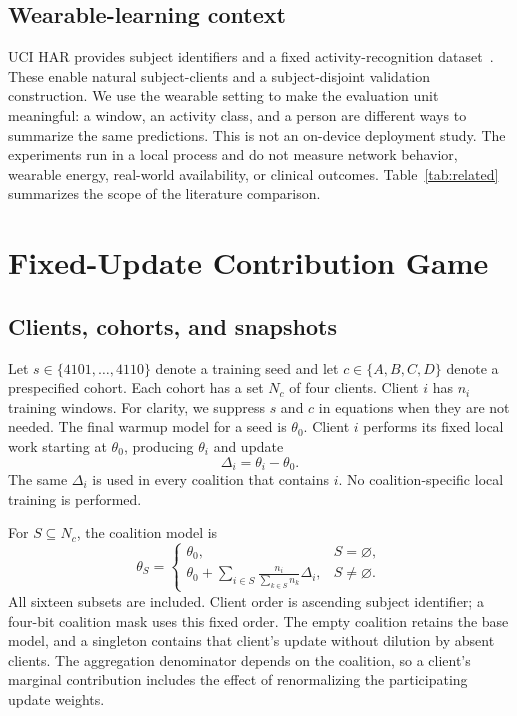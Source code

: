 \documentclass[conference,letterpaper]{IEEEtran}
\begin{document}
\subsection{Wearable-learning context}
UCI HAR provides subject identifiers and a fixed activity-recognition dataset~\cite{har,uci}. These enable natural subject-clients and a subject-disjoint validation construction. We use the wearable setting to make the evaluation unit meaningful: a window, an activity class, and a person are different ways to summarize the same predictions. This is not an on-device deployment study. The experiments run in a local process and do not measure network behavior, wearable energy, real-world availability, or clinical outcomes. Table~\ref{tab:related} summarizes the scope of the literature comparison.

\section{Fixed-Update Contribution Game}
\subsection{Clients, cohorts, and snapshots}
Let $s\in\{4101,\ldots,4110\}$ denote a training seed and let $c\in\{A,B,C,D\}$ denote a prespecified cohort. Each cohort has a set $N_c$ of four clients. Client $i$ has $n_i$ training windows. For clarity, we suppress $s$ and $c$ in equations when they are not needed. The final warmup model for a seed is $\theta_0$. Client $i$ performs its fixed local work starting at $\theta_0$, producing $\theta_i$ and update
\begin{equation}
\Delta_i=\theta_i-\theta_0.
\end{equation}
The same $\Delta_i$ is used in every coalition that contains $i$. No coalition-specific local training is performed.

For $S\subseteq N_c$, the coalition model is
\begin{equation}
\theta_S=\begin{cases}
\theta_0,&S=\varnothing,\\
\displaystyle\theta_0+\sum_{i\in S}\frac{n_i}{\sum_{k\in S}n_k}\Delta_i,&S\ne\varnothing.
\end{cases}
\label{eq:coalition}
\end{equation}
All sixteen subsets are included. Client order is ascending subject identifier; a four-bit coalition mask uses this fixed order. The empty coalition retains the base model, and a singleton contains that client's update without dilution by absent clients. The aggregation denominator depends on the coalition, so a client's marginal contribution includes the effect of renormalizing the participating update weights.
\end{document}
